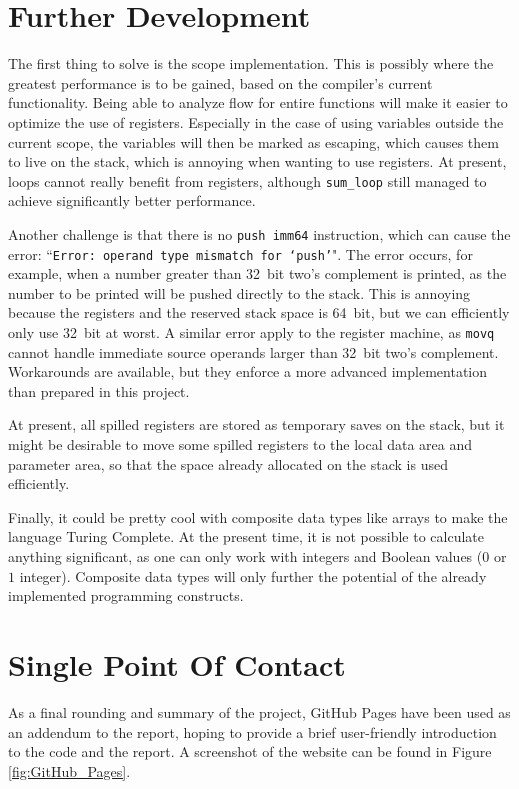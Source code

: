 \section{Further Development}
The first thing to solve is the scope implementation. This is possibly where the greatest performance is to be gained, based on the compiler's current functionality. Being able to analyze flow for entire functions will make it easier to optimize the use of registers. Especially in the case of using variables outside the current scope, the variables will then be marked as escaping, which causes them to live on the stack, which is annoying when wanting to use registers. At present, loops cannot really benefit from registers, although \texttt{sum\_loop} still managed to achieve significantly better performance.

Another challenge is that there is no \texttt{push imm64} instruction, which can cause the error: ``\texttt{Error: operand type mismatch for `push'}". The error occurs, for example, when a number greater than \SI{32}{bit} two's complement is printed, as the number to be printed will be pushed directly to the stack. This is annoying because the registers and the reserved stack space is \SI{64}{bit}, but we can efficiently only use \SI{32}{bit} at worst. A similar error apply to the register machine, as \texttt{movq} cannot handle immediate source operands larger than \SI{32}{bit} two's complement. Workarounds are available, but they enforce a more advanced implementation than prepared in this project. 

At present, all spilled registers are stored as temporary saves on the stack, but it might be desirable to move some spilled registers to the local data area and parameter area, so that the space already allocated on the stack is used efficiently.

Finally, it could be pretty cool with composite data types like arrays to make the language Turing Complete. At the present time, it is not possible to calculate anything significant, as one can only work with integers and Boolean values ($0$ or $1$ integer). Composite data types will only further the potential of the already implemented programming constructs.


\section{Single Point Of Contact}
As a final rounding and summary of the project, GitHub Pages have been used as an addendum to the report, hoping to provide a brief user-friendly introduction to the code and the report. A screenshot of the website can be found in Figure \ref{fig:GitHub_Pages}.

